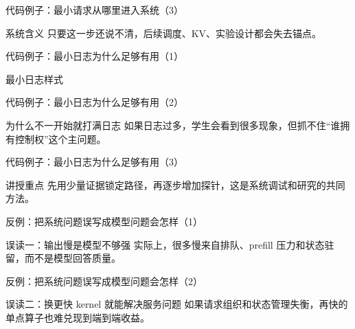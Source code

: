 \begin{frame}{代码例子：最小请求从哪里进入系统（3）}
  \begin{block}{系统含义}
    只要这一步还说不清，后续调度、KV、实验设计都会失去锚点。
  \end{block}
\end{frame}

\begin{frame}{代码例子：最小日志为什么足够有用（1）}
  \begin{block}{最小日志样式}
    {\ttfamily\small
    \par
    \par
    }
  \end{block}
\end{frame}

\begin{frame}{代码例子：最小日志为什么足够有用（2）}
  \begin{block}{为什么不一开始就打满日志}
    如果日志过多，学生会看到很多现象，但抓不住“谁拥有控制权”这个主问题。
  \end{block}
\end{frame}

\begin{frame}{代码例子：最小日志为什么足够有用（3）}
  \begin{block}{讲授重点}
    先用少量证据锁定路径，再逐步增加探针，这是系统调试和研究的共同方法。
  \end{block}
\end{frame}

\begin{frame}{反例：把系统问题误写成模型问题会怎样（1）}
  \begin{block}{误读一：输出慢是模型不够强}
    实际上，很多慢来自排队、prefill 压力和状态驻留，而不是模型回答质量。
  \end{block}
\end{frame}

\begin{frame}{反例：把系统问题误写成模型问题会怎样（2）}
  \begin{block}{误读二：换更快 kernel 就能解决服务问题}
    如果请求组织和状态管理失衡，再快的单点算子也难兑现到端到端收益。
  \end{block}
\end{frame}


